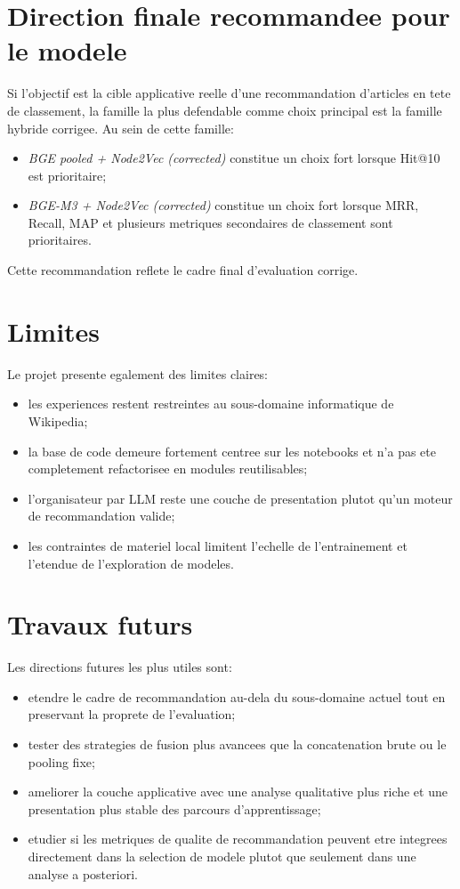 \section{Direction finale recommandee pour le modele}

Si l'objectif est la cible applicative reelle d'une recommandation d'articles
en tete de classement, la famille la plus defendable comme choix principal est
la famille hybride corrigee. Au sein de cette famille:
\begin{itemize}
    \item \textit{BGE pooled + Node2Vec (corrected)} constitue un choix fort
    lorsque Hit@10 est prioritaire;
    \item \textit{BGE-M3 + Node2Vec (corrected)} constitue un choix fort
    lorsque MRR, Recall, MAP et plusieurs metriques secondaires de classement
    sont prioritaires.
\end{itemize}

Cette recommandation reflete le cadre final d'evaluation corrige.

\section{Limites}

Le projet presente egalement des limites claires:
\begin{itemize}
    \item les experiences restent restreintes au sous-domaine informatique de
    Wikipedia;
    \item la base de code demeure fortement centree sur les notebooks et n'a
    pas ete completement refactorisee en modules reutilisables;
    \item l'organisateur par LLM reste une couche de presentation plutot qu'un
    moteur de recommandation valide;
    \item les contraintes de materiel local limitent l'echelle de
    l'entrainement et l'etendue de l'exploration de modeles.
\end{itemize}

\section{Travaux futurs}

Les directions futures les plus utiles sont:
\begin{itemize}
    \item etendre le cadre de recommandation au-dela du sous-domaine actuel tout
    en preservant la proprete de l'evaluation;
    \item tester des strategies de fusion plus avancees que la concatenation
    brute ou le pooling fixe;
    \item ameliorer la couche applicative avec une analyse qualitative plus
    riche et une presentation plus stable des parcours d'apprentissage;
    \item etudier si les metriques de qualite de recommandation peuvent etre
    integrees directement dans la selection de modele plutot que seulement dans
    une analyse a posteriori.
\end{itemize}

